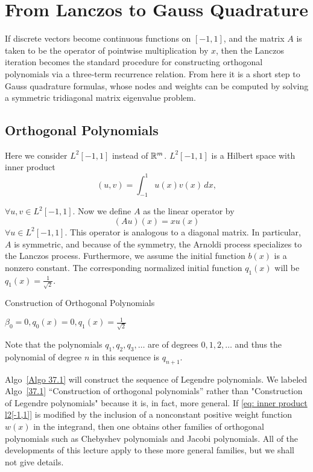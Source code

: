 \chapter{From Lanczos to Gauss Quadrature}

If discrete vectors become continuous functions on $[-1,1]$, and the matrix $A$ is taken to be the operator of pointwise multiplication by $x$, then the Lanczos iteration becomes the standard procedure for constructing orthogonal polynomials via a three-term recurrence relation. From here it is a short step to Gauss quadrature formulas, whose nodes and weights can be computed by solving a symmetric tridiagonal matrix eigenvalue problem.

\section{Orthogonal Polynomials} 
Here we consider $ L^2[-1,1] $ instead of $ \mathbb{R}^{m} $.  $ L^2[-1,1] $ is a Hilbert space with inner product 
\begin{equation}
\label{eq: inner product l2[-1,1]}
        (u,v) = \int_{-1}^{1} u(x) v(x) \, dx,
\end{equation}

$ \forall u,v\in L^{2} [-1,1] $.  Now we define $ A $ as the linear operator by 
\[
    (Au)(x) =xu(x)
\]
$ \forall u\in L^{2} [-1,1] $. This operator is analogous to a diagonal matrix. In particular, $ A $ is symmetric, and because of the symmetry, the Arnoldi process specializes to the Lanczos process. Furthermore, we assume the initial function $ b(x) $ is a nonzero constant. The corresponding normalized initial function $ q_1(x) $ will be $ q_1(x) = \frac{1}{\sqrt{2} } $. 

\begin{algorithm}[H]
    \caption{Construction of Orthogonal Polynomials}
    \label{Algo 37.1}
    $ \beta _0=0, q_0(x) = 0, q_1(x) = \frac{1}{\sqrt{2} } $\; 
\end{algorithm}

Note that the polynomials $ q_1,q_2,q_3,\ldots  $ are of degrees $ 0,1,2,\ldots  $ and thus the polynomial of degree $ n $ in this sequence is $ q_{n+1} $. 

Algo~\ref{Algo 37.1} will construct the sequence of Legendre polynomials. We labeled Algo~\ref{37.1} ``Construction of orthogonal polynomials'' rather than "Construction of Legendre polynomials" because it is, in fact, more general. If \eqref{eq: inner product l2[-1,1]} is modified by the inclusion of a nonconstant positive weight function $w(x)$ in the integrand, then one obtains other families of orthogonal polynomials such as Chebyshev polynomials and Jacobi polynomials. All of the developments of this lecture apply to these more general families, but we shall not give details.

